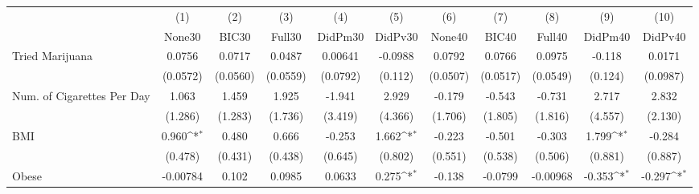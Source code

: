 {
\def\sym#1{\ifmmode^{#1}\else\(^{#1}\)\fi}
\begin{tabular}{l*{10}{c}}
\toprule
            &\multicolumn{1}{c}{(1)}&\multicolumn{1}{c}{(2)}&\multicolumn{1}{c}{(3)}&\multicolumn{1}{c}{(4)}&\multicolumn{1}{c}{(5)}&\multicolumn{1}{c}{(6)}&\multicolumn{1}{c}{(7)}&\multicolumn{1}{c}{(8)}&\multicolumn{1}{c}{(9)}&\multicolumn{1}{c}{(10)}\\
            &\multicolumn{1}{c}{None30}&\multicolumn{1}{c}{BIC30}&\multicolumn{1}{c}{Full30}&\multicolumn{1}{c}{DidPm30}&\multicolumn{1}{c}{DidPv30}&\multicolumn{1}{c}{None40}&\multicolumn{1}{c}{BIC40}&\multicolumn{1}{c}{Full40}&\multicolumn{1}{c}{DidPm40}&\multicolumn{1}{c}{DidPv40}\\
\midrule
Tried Marijuana&      0.0756         &      0.0717         &      0.0487         &     0.00641         &     -0.0988         &      0.0792         &      0.0766         &      0.0975         &      -0.118         &      0.0171         \\
            &    (0.0572)         &    (0.0560)         &    (0.0559)         &    (0.0792)         &     (0.112)         &    (0.0507)         &    (0.0517)         &    (0.0549)         &     (0.124)         &    (0.0987)         \\
\addlinespace
Num. of Cigarettes Per Day&       1.063         &       1.459         &       1.925         &      -1.941         &       2.929         &      -0.179         &      -0.543         &      -0.731         &       2.717         &       2.832         \\
            &     (1.286)         &     (1.283)         &     (1.736)         &     (3.419)         &     (4.366)         &     (1.706)         &     (1.805)         &     (1.816)         &     (4.557)         &     (2.130)         \\
\addlinespace
BMI         &       0.960\sym{*}  &       0.480         &       0.666         &      -0.253         &       1.662\sym{*}  &      -0.223         &      -0.501         &      -0.303         &       1.799\sym{*}  &      -0.284         \\
            &     (0.478)         &     (0.431)         &     (0.438)         &     (0.645)         &     (0.802)         &     (0.551)         &     (0.538)         &     (0.506)         &     (0.881)         &     (0.887)         \\
\addlinespace
Obese       &    -0.00784         &       0.102         &      0.0985         &      0.0633         &       0.275\sym{*}  &      -0.138         &     -0.0799         &    -0.00968         &      -0.353\sym{*}  &      -0.297\sym{*}  \\

\end{tabular}}
